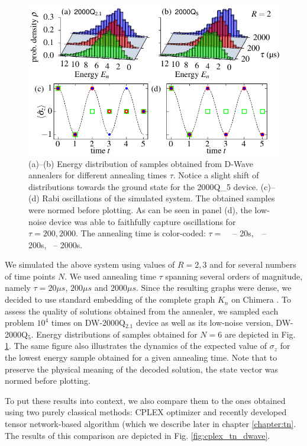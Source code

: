 \begin{figure}[!h]
  \centering
  \includegraphics{figures/fig2.pdf}
  \caption{(a)--(b) Energy distribution of samples obtained from D-Wave annealers for different annealing times $\tau$. Notice a slight shift of distributions towards the ground state for the 2000Q\_{5} device. (c)--(d) Rabi oscillations of the simulated system. The obtained samples were normed before plotting. As can be seen in panel (d), the low-noise device was able to faithfully capture oscillations for $\tau=200, 2000$.
    The annealing time is color-coded: $\tau=$
    \tikzquad\,\,\, -- 20\textmu{}s,
    \,\tikzcircle\,\,\,-- 200\textmu{}s,
    \,\tikzdot\,\,-- 2000\textmu{}s.
  }
  \label{fig:energy-hist}
\end{figure}

We simulated the above system using values of $R=2, 3$ and for several numbers
of time points $N$. We used annealing time $\tau$ spanning several orders of
magnitude, namely $\tau=20\mu s$, $200 \mu s$ and $2000 \mu s$. Since the resulting
graphs were dense, we decided to use standard embedding of the complete graph
$K_n$ on Chimera \cite{chimeraclique}. To assess the quality of solutions obtained from the
annealer, we sampled each problem $10^4$ times on DW-2000Q$_{2.1}$ device as
well as its low-noise version, DW-2000Q$_{5}$. Energy distributions of samples
obtained for $N=6$ are depicted in Fig. \ref{fig:energy-hist}. The same figure
also illustrates the dynamics of the expected value of $\sigma_z$ for the
lowest energy sample obtained for a given annealing time. Note that to preserve
the physical meaning of the decoded solution, the state vector was normed before
plotting.

To put these results into context, we also compare them to the ones obtained
using two purely classical methods: CPLEX optimizer and recently developed
tensor network-based algorithm (which we describe later in chapter
\ref{chapter:tn}.
The results of this comparison are depicted in Fig. \ref{fig:cplex_tn_dwave}.

